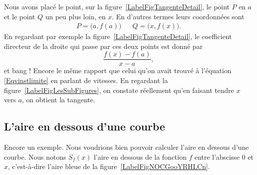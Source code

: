 \newcommand{\CaptionFigTangenteDetail}{Traçons d'abord une corde entre le point \( P\) et un point \( Q\) un peu plus loin.}


Nous avons placé le point, sur la figure~\ref{LabelFigTangenteDetail}, le point \( P\) en \( a\) et le point \( Q\) un peu plus loin, en \( x\). En d'autres termes leurs coordonnées sont
\begin{align}
	P=\big(a,f(a)\big) &  & Q=\big(x,f(x)\big).
\end{align}
En regardant par exemple la figure~\ref{LabelFigTangenteDetail}, le coefficient directeur de la droite qui passe par ces deux points est donné par
\begin{equation}
	\frac{ f(x)-f(a) }{ x-a },
\end{equation}
et bang ! Encore le même rapport que celui qu'on avait trouvé à l'équation \eqref{Eqvinstlimite} en parlant de vitesses. En regardant la figure~\ref{LabelFigLesSubFigures}, on constate réellement qu'en faisant tendre \( x\) vers \( a\), on obtient la tangente.

\newcommand{\CaptionFigLesSubFigures}{Recherche de la tangente par approximations successives.}


\subsection{L'aire en dessous d'une courbe}		\label{SubSecAirePrimInto}

Encore un exemple. Nous voudrions bien pouvoir calculer l'aire en dessous d'une courbe. Nous notons \( S_f(x)\) l'aire en dessous de la fonction \( f\) entre l'abscisse \( 0\) et \( x\), c'est-à-dire l'aire bleue de la figure~\ref{LabelFigNOCGooYRHLCn}. %
\newcommand{\CaptionFigNOCGooYRHLCn}{L'aire en dessous d'une courbe. Le rectangle rouge d'aire \( f(x)\Delta x\) approxime l'augmentation de l'aire lorsqu'on passe de \( x\) à \( x+\Delta x\).}


